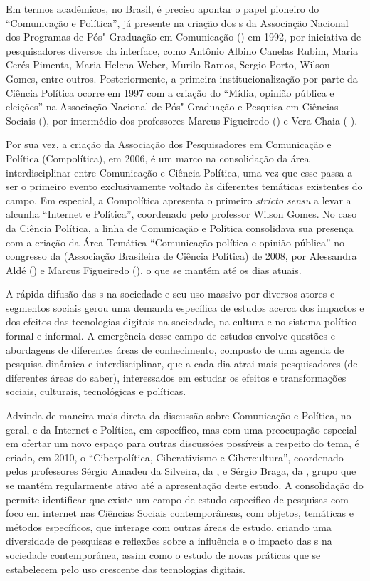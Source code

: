 Em termos acadêmicos, no Brasil, é preciso apontar o papel pioneiro do
 ``Comunicação e Política'', já presente na criação dos s da
Associação Nacional dos Programas de Pós"-Graduação em Comunicação
() em 1992, por iniciativa de pesquisadores diversos da interface,
como Antônio Albino Canelas Rubim, Maria Cerés Pimenta, Maria Helena
Weber, Murilo Ramos, Sergio Porto, Wilson Gomes, entre outros.
Posteriormente, a primeira institucionalização por parte da Ciência
Política ocorre em 1997 com a criação do  ``Mídia, opinião pública e
eleições'' na Associação Nacional de Pós"-Graduação e Pesquisa em
Ciências Sociais (), por intermédio dos professores Marcus
Figueiredo () e Vera Chaia (-).

Por sua vez, a criação da Associação dos Pesquisadores em Comunicação e
Política (Compolítica), em 2006, é um marco na consolidação da área
interdisciplinar entre Comunicação e Ciência Política, uma vez que esse
passa a ser o primeiro evento exclusivamente voltado às diferentes
temáticas existentes do campo. Em especial, a Compolítica apresenta o
primeiro  \emph{stricto sensu} a levar a alcunha ``Internet e
Política'', coordenado pelo professor Wilson Gomes. No caso da Ciência
Política, a linha de Comunicação e Política consolidava sua presença com
a criação da Área Temática ``Comunicação política e opinião pública'' no
congresso da  (Associação Brasileira de Ciência Política) de 2008,
por Alessandra Aldé () e Marcus Figueiredo (), o que se mantém
até os dias atuais.

A rápida difusão das s na sociedade e seu uso massivo por diversos
atores e segmentos sociais gerou uma demanda específica de estudos
acerca dos impactos e dos efeitos das tecnologias digitais na sociedade,
na cultura e no sistema político formal e informal. A emergência desse
campo de estudos envolve questões e abordagens de diferentes áreas de
conhecimento, composto de uma agenda de pesquisa dinâmica e
interdisciplinar, que a cada dia atrai mais pesquisadores (de diferentes
áreas do saber), interessados em estudar os efeitos e transformações
sociais, culturais, tecnológicas e políticas.

Advinda de maneira mais direta da discussão sobre Comunicação e
Política, no geral, e da Internet e Política, em específico, mas com uma
preocupação especial em ofertar um novo espaço para outras discussões
possíveis a respeito do tema, é criado, em 2010, o  ``Ciberpolítica,
Ciberativismo e Cibercultura'', coordenado pelos professores Sérgio
Amadeu da Silveira, da , e Sérgio Braga, da , grupo que se
mantém regularmente ativo até a apresentação deste estudo. A
consolidação do  permite identificar que existe um campo de estudo
específico de pesquisas com foco em internet nas Ciências Sociais
contemporâneas, com objetos, temáticas e métodos específicos, que
interage com outras áreas de estudo, criando uma diversidade de
pesquisas e reflexões sobre a influência e o impacto das s na
sociedade contemporânea, assim como o estudo de novas práticas que se
estabelecem pelo uso crescente das tecnologias digitais.

